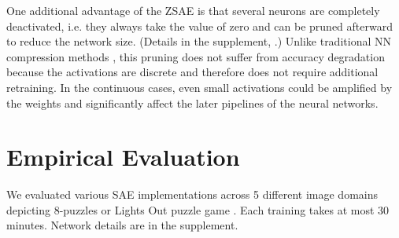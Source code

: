 

One additional advantage of the ZSAE is that
several neurons are completely deactivated, i.e. they always take the value of zero
and can be pruned afterward to reduce the network size.
(Details in the supplement, .)
Unlike traditional NN compression methods \cite{cheng2017survey}, this pruning does not suffer from
accuracy degradation because the activations are discrete and therefore does not require additional retraining.
In the continuous cases, even small activations could be amplified by the weights and significantly affect the
later pipelines of the neural networks.

\section{Empirical Evaluation}
\label{evaluation}

We evaluated various SAE implementations across 5 different
image domains depicting 8-puzzles or Lights Out puzzle game \cite{lightsout}.
Each training takes at most 30 minutes.
Network details are in the supplement.

